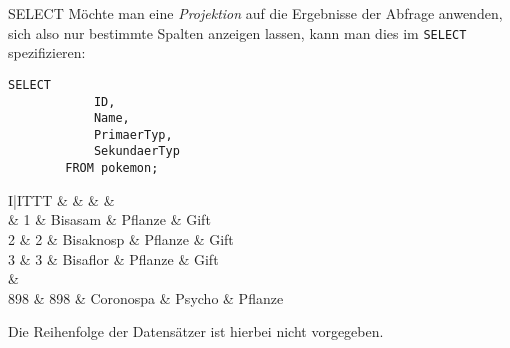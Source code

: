 \begin{sql}{SELECT}
    Möchte man eine \emph{Projektion} auf die Ergebnisse der Abfrage anwenden, sich also nur bestimmte Spalten anzeigen lassen, kann man dies im \texttt{SELECT} spezifizieren:

    \begin{lstlisting}[language=mysql]
        SELECT
            ID,
            Name,
            PrimaerTyp,
            SekundaerTyp
        FROM pokemon;
    \end{lstlisting}

    \setcounter{rownum}{0}
    \begin{tabular}{I|ITTT}
                                   &     &  &  &  \\                          & 1                         & Bisasam                  & Pflanze                        & Gift                             \\
        2                          & 2                         & Bisaknosp                & Pflanze                        & Gift                             \\
        3                          & 3                         & Bisaflor                 & Pflanze                        & Gift                             \\
         &                                                                                                 \\
        898                        & 898                       & Coronospa                & Psycho                         & Pflanze                          \\
    \end{tabular}
    \vspace{1em}

    Die Reihenfolge der Datensätzer ist hierbei nicht vorgegeben.
\end{sql}

